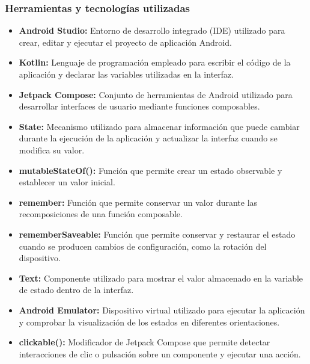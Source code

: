 \documentclass[12pt,a4paper]{article}
\begin{document}
\subsubsection{Herramientas y tecnologías utilizadas}

\begin{itemize}
	
	\item \textbf{Android Studio:} Entorno de desarrollo integrado (IDE) utilizado para crear, editar y ejecutar el proyecto de aplicación Android.
	
	\item \textbf{Kotlin:} Lenguaje de programación empleado para escribir el código de la aplicación y declarar las variables utilizadas en la interfaz.
	
	\item \textbf{Jetpack Compose:} Conjunto de herramientas de Android utilizado para desarrollar interfaces de usuario mediante funciones composables.
	
	\item \textbf{State:} Mecanismo utilizado para almacenar información que puede cambiar durante la ejecución de la aplicación y actualizar la interfaz cuando se modifica su valor.
	
	\item \textbf{mutableStateOf():} Función que permite crear un estado observable y establecer un valor inicial.
	
	\item \textbf{remember:} Función que permite conservar un valor durante las recomposiciones de una función composable.
	
	\item \textbf{rememberSaveable:} Función que permite conservar y restaurar el estado cuando se producen cambios de configuración, como la rotación del dispositivo.
	
	\item \textbf{Text:} Componente utilizado para mostrar el valor almacenado en la variable de estado dentro de la interfaz.
	
	\item \textbf{Android Emulator:} Dispositivo virtual utilizado para ejecutar la aplicación y comprobar la visualización de los estados en diferentes orientaciones.
	
	\item \textbf{clickable():} Modificador de Jetpack Compose que permite detectar interacciones de clic o pulsación sobre un componente y ejecutar una acción.
	
\end{itemize}
\end{document}
